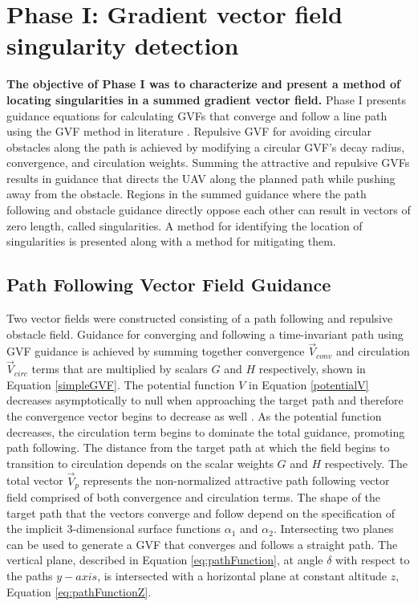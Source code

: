 \documentclass[numbered,pdftex]{ohio-etd}
\begin{document}
\section{Phase I: Gradient vector field singularity detection}
 \textbf{The objective of Phase I was to characterize and present a method of locating singularities in a summed gradient vector field.} Phase I presents guidance equations for calculating GVFs that converge and follow a line path using the GVF method in literature \cite{goncalves_artificial_2009,goncalves_circulation_2010,goncalves_vector_2010}. Repulsive GVF for avoiding circular obstacles along the path is achieved by modifying a circular GVF's decay radius, convergence, and circulation weights. Summing the attractive and repulsive GVFs results in guidance that directs the UAV along the planned path while pushing away from the obstacle. Regions in the summed guidance where the path following and obstacle guidance directly oppose each other can result in vectors of zero length, called singularities. A method for identifying the location of singularities is presented along with a method for mitigating them. 
 

\subsection{Path Following Vector Field Guidance}
Two vector fields were constructed consisting of a path following and repulsive obstacle field. Guidance for converging and following a time-invariant path using GVF guidance is achieved by summing together convergence $\overrightarrow{V}_{conv}$ and circulation $\overrightarrow{V}_{circ}$ terms that are multiplied by scalars $G$ and $H$ respectively, shown in Equation \ref{simpleGVF}. The potential function $V$ in Equation \ref{potentialV} decreases asymptotically to null when approaching the target path and therefore the convergence vector begins to decrease as well \cite{goncalves_artificial_2009}. As the potential function decreases, the circulation term begins to dominate the total guidance, promoting path following. The distance from the target path at which the field begins to transition to circulation depends on the scalar weights $G$ and $H$ respectively. The total vector $\overrightarrow{V}_p$ represents the non-normalized attractive path following vector field comprised of both convergence and circulation terms. The shape of the target path that the vectors converge and follow depend on the specification of the implicit 3-dimensional surface functions $\alpha_1$ and $\alpha_2$. Intersecting two planes can be used to generate a GVF that converges and follows a straight path. The vertical plane, described in Equation \ref{eq:pathFunction}, at angle $\delta$ with respect to the paths $y-axis$, is intersected with a horizontal plane at constant altitude $z$, Equation \ref{eq:pathFunctionZ}.
\end{document}
